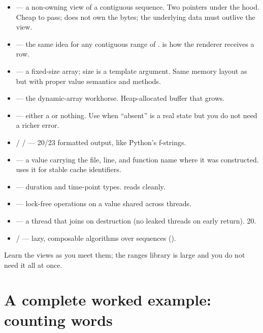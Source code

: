 \begin{itemize}[leftmargin=*]
  \item {} --- a non-owning view of a
    contiguous  sequence. Two pointers under the hood.
    Cheap to pass; does not own the bytes; the underlying data must
    outlive the view.
  \item {} --- the same idea for any contiguous
    range of .  is how the
    renderer receives a row.
  \item {} --- a fixed-size array; size is a
    template argument. Same memory layout as  but with
    proper value semantics and methods.
  \item {} --- the dynamic-array workhorse.
    Heap-allocated buffer that grows.
  \item {} --- either a  or nothing. Use
    when ``absent'' is a real state but you do not need a richer
    error.
  \item {} /  / 
    --- \cpp{}20/23 formatted output, like Python's f-strings.
  \item {} --- a value carrying the file,
    line, and function name where it was constructed. \maya{} uses
    it for stable cache identifiers.
  \item {} --- duration and time-point types.
     reads cleanly.
  \item {} --- lock-free operations on a value
    shared across threads.
  \item {} --- a thread that joins on destruction
    (no leaked threads on early return). \cpp{}20.
  \item {} /  --- lazy, composable
    algorithms over sequences ().
\end{itemize}

Learn the views as you meet them; the ranges library is large and you
do not need it all at once.

\section{A complete worked example: counting words}
\label{sec:cpp:worked}

